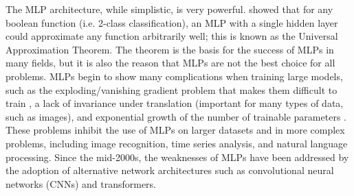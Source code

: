 The MLP architecture, while simplistic, is very powerful. \textcite{cybenko1989} showed that for any boolean 
function (i.e. 2-class classification), an MLP with a single hidden layer could 
approximate any function arbitrarily well; this is known as the Universal Approximation
Theorem. The theorem is the basis for the success of MLPs in
many fields, but it is also the reason that MLPs are not the best choice for all problems.
MLPs begin to show many complications when training large models, such as the 
exploding/vanishing gradient problem that makes them difficult to train \parencite{nielsen2015}, a lack of invariance under translation (important for many types of data, such as images), 
and exponential growth of the number of trainable parameters \parencite{Naskath2022}. These problems inhibit the use of MLPs on larger datasets and in more complex problems, including 
image recognition, time series analysis, and natural language processing. Since 
the mid-2000s, the weaknesses of MLPs have been addressed by the adoption of 
alternative network architectures such as convolutional neural networks (CNNs) and
transformers.

